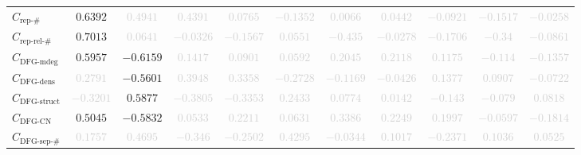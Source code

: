 \documentclass{standalone}
\newcommand{\repnumname}{\text{rep-\#}}
\newcommand{\repnum}{C_{\repnumname}}
\newcommand{\reprelnumname}{\text{rep-rel-\#}}
\newcommand{\reprelnum}{C_{\reprelnumname}}
\newcommand{\dfgmaxdegname}{\text{DFG-mdeg}}
\newcommand{\dfgmaxdeg}{C_{\dfgmaxdegname}}
\newcommand{\dfgdensname}{\text{DFG-dens}}
\newcommand{\dfgdens}{C_{\dfgdensname}}
\newcommand{\dfgstructname}{\text{DFG-struct}}
\newcommand{\dfgstruct}{C_{\dfgstructname}}
\newcommand{\dfgcycnumbername}{\text{DFG-CN}}
\newcommand{\dfgcycnumber}{C_{\dfgcycnumbername}}
\newcommand{\dfgsepnumname}{\text{DFG-sep-\#}}
\newcommand{\dfgsepnum}{C_{\dfgsepnumname}}
\begin{document}
\begin{tabular}{lcccccccccc}
$\repnum$ & $0.6392$ & \textcolor{lightgray}{$0.4941$} & \textcolor{lightgray}{$0.4391$} & \textcolor{lightgray}{$0.0765$} & \textcolor{lightgray}{$-0.1352$} & \textcolor{lightgray}{$0.0066$} & \textcolor{lightgray}{$0.0442$} & \textcolor{lightgray}{$-0.0921$} & \textcolor{lightgray}{$-0.1517$} & \textcolor{lightgray}{$-0.0258$} \\ 
$\reprelnum$ & $0.7013$ & \textcolor{lightgray}{$0.0641$} & \textcolor{lightgray}{$-0.0326$} & \textcolor{lightgray}{$-0.1567$} & \textcolor{lightgray}{$0.0551$} & \textcolor{lightgray}{$-0.435$} & \textcolor{lightgray}{$-0.0278$} & \textcolor{lightgray}{$-0.1706$} & \textcolor{lightgray}{$-0.34$} & \textcolor{lightgray}{$-0.0861$} \\ 
$\dfgmaxdeg$ & $0.5957$ & $-0.6159$ & \textcolor{lightgray}{$0.1417$} & \textcolor{lightgray}{$0.0901$} & \textcolor{lightgray}{$0.0592$} & \textcolor{lightgray}{$0.2045$} & \textcolor{lightgray}{$0.2118$} & \textcolor{lightgray}{$0.1175$} & \textcolor{lightgray}{$-0.114$} & \textcolor{lightgray}{$-0.1357$} \\ 
$\dfgdens$ & \textcolor{lightgray}{$0.2791$} & $-0.5601$ & \textcolor{lightgray}{$0.3948$} & \textcolor{lightgray}{$0.3358$} & \textcolor{lightgray}{$-0.2728$} & \textcolor{lightgray}{$-0.1169$} & \textcolor{lightgray}{$-0.0426$} & \textcolor{lightgray}{$0.1377$} & \textcolor{lightgray}{$0.0907$} & \textcolor{lightgray}{$-0.0722$} \\ 
$\dfgstruct$ & \textcolor{lightgray}{$-0.3201$} & $0.5877$ & \textcolor{lightgray}{$-0.3805$} & \textcolor{lightgray}{$-0.3353$} & \textcolor{lightgray}{$0.2433$} & \textcolor{lightgray}{$0.0774$} & \textcolor{lightgray}{$0.0142$} & \textcolor{lightgray}{$-0.143$} & \textcolor{lightgray}{$-0.079$} & \textcolor{lightgray}{$0.0818$} \\ 
$\dfgcycnumber$ & $0.5045$ & $-0.5832$ & \textcolor{lightgray}{$0.0533$} & \textcolor{lightgray}{$0.2211$} & \textcolor{lightgray}{$0.0631$} & \textcolor{lightgray}{$0.3386$} & \textcolor{lightgray}{$0.2249$} & \textcolor{lightgray}{$0.1997$} & \textcolor{lightgray}{$-0.0597$} & \textcolor{lightgray}{$-0.1814$} \\ 
$\dfgsepnum$ & \textcolor{lightgray}{$0.1757$} & \textcolor{lightgray}{$0.4695$} & \textcolor{lightgray}{$-0.346$} & \textcolor{lightgray}{$-0.2502$} & \textcolor{lightgray}{$0.4295$} & \textcolor{lightgray}{$-0.0344$} & \textcolor{lightgray}{$0.1017$} & \textcolor{lightgray}{$-0.2371$} & \textcolor{lightgray}{$0.1036$} & \textcolor{lightgray}{$0.0525$} \\ 

\end{tabular}
\end{document}
